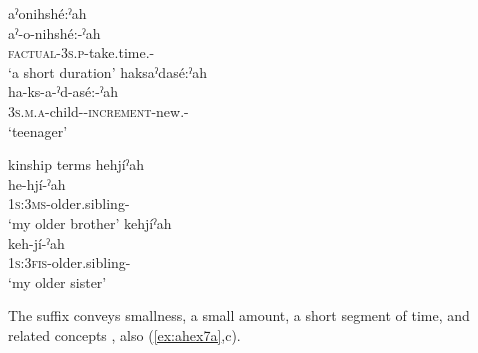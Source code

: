 \ex aˀonihshé:ˀah\\
\gll aˀ-o-nihshé:-ˀah\\
 \textsc{factual-3s.p}-take.time.\textsc{\punctual-\diminutive}\\
\glt `a short duration'
\ex haksaˀdasé:ˀah\\
\gll ha-ks-a-ˀd-asé:-ˀah\\
 \textsc{3s.m.a}-child-{\joinerA}-\textsc{increment}-new.{\stative}-{\diminutive}\\
\glt `teenager'
\z
\z

\ea\label{ex:ahex6} kinship terms
\ea hehjíˀah\\
\gll he-hjí-ˀah\\
 \textsc{1s:3ms}-older.sibling-{\diminutive}\\
\glt `my older brother'
\ex kehjíˀah\\
\gll keh-jí-ˀah\\
 \textsc{1s:3fis}-older.sibling-{\diminutive}\\
\glt `my older sister'
\z
\z

The  {\diminutive} suffix conveys smallness, a small amount, a short segment of time, and related concepts , also (\ref{ex:ahex7a},c).

